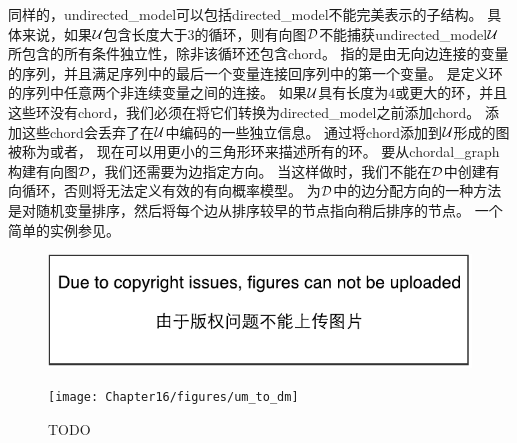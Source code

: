 同样的，\gls{undirected_model}可以包括\gls{directed_model}不能完美表示的子结构。
具体来说，如果$\mathcal{U}$包含长度大于$3$的循环，则有向图$\mathcal{D}$不能捕获\gls{undirected_model}$\mathcal{U}$所包含的所有条件独立性，除非该循环还包含\gls{chord}。
指的是由无向边连接的变量的序列，并且满足序列中的最后一个变量连接回序列中的第一个变量。
是定义环的序列中任意两个非连续变量之间的连接。
如果$\mathcal{U}$具有长度为$4$或更大的环，并且这些环没有\gls{chord}，我们必须在将它们转换为\gls{directed_model}之前添加\gls{chord}。
添加这些\gls{chord}会丢弃了在$\mathcal{U}$中编码的一些独立信息。
通过将\gls{chord}添加到$\mathcal{U}$形成的图被称为或者，
现在可以用更小的三角形环来描述所有的环。
要从\gls{chordal_graph}构建有向图$\mathcal{D}$，我们还需要为边指定方向。
当这样做时，我们不能在$\mathcal{D}$中创建有向循环，否则将无法定义有效的有向概率模型。
为$\mathcal{D}$中的边分配方向的一种方法是对随机变量排序，然后将每个边从排序较早的节点指向稍后排序的节点。
一个简单的实例参见。


\begin{figure}[!htb]
\ifOpenSource
\centerline{\includegraphics{figure.pdf}}
\else
	\centerline{\texttt{[image: Chapter16/figures/um\_to\_dm]}}	
\fi
	\caption{TODO}
	\label{fig:um_to_dm}
\end{figure}



\subsection{}
\label{sec:factor_graphs}



